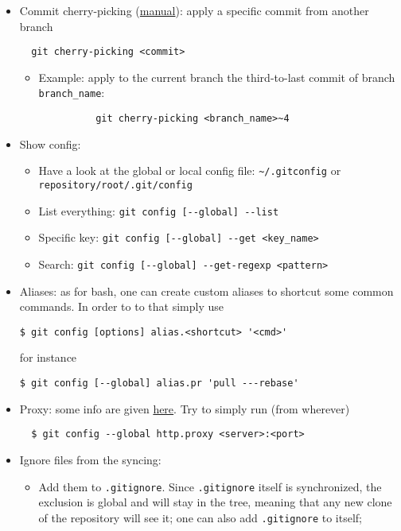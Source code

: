 \documentclass[a4paper,12pt,%
              final%
              ]{article}
\begin{document}
\begin{itemize}
\begin{itemize}
    \end{itemize}
  \item Commit cherry-picking (\href{https://git-scm.com/docs/git-cherry-pick}{manual}): apply a specific commit from another branch
\begin{verbatim}
  git cherry-picking <commit>
\end{verbatim}
    \begin{itemize}
      \item Example: apply to the current branch the third-to-last commit of branch \verb|branch_name|:
        \begin{verbatim}
          git cherry-picking <branch_name>~4
        \end{verbatim}
    \end{itemize}
  \item Show config:
    \begin{itemize}
      \item Have a look at the global or local config file: \verb|~/.gitconfig| or \verb|repository/root/.git/config|
      \item List everything: \verb|git config [--global] --list|
      \item Specific key: \verb|git config [--global] --get <key_name>|
      \item Search: \verb|git config [--global] --get-regexp <pattern>|
    \end{itemize}
  \item Aliases: as for bash, one can create custom aliases to shortcut some common commands. In order to to that simply use
\begin{verbatim}
$ git config [options] alias.<shortcut> '<cmd>'
\end{verbatim}
        for instance
\begin{verbatim}
$ git config [--global] alias.pr 'pull ---rebase'
\end{verbatim}
  \item Proxy: some info are given \href{https://gist.github.com/evantoli/f8c23a37eb3558ab8765}{here}. Try to simply run (from wherever)
\begin{verbatim}
  $ git config --global http.proxy <server>:<port>
\end{verbatim}
  \item Ignore files from the syncing:
    \begin{itemize}
      \item Add them to \texttt{.gitignore}. Since \texttt{.gitignore} itself is synchronized, the exclusion is global and will stay in the tree, meaning that any new clone of the repository will see it; one can also add \texttt{.gitignore} to itself;

\end{itemize}
\end{itemize}
\end{document}
